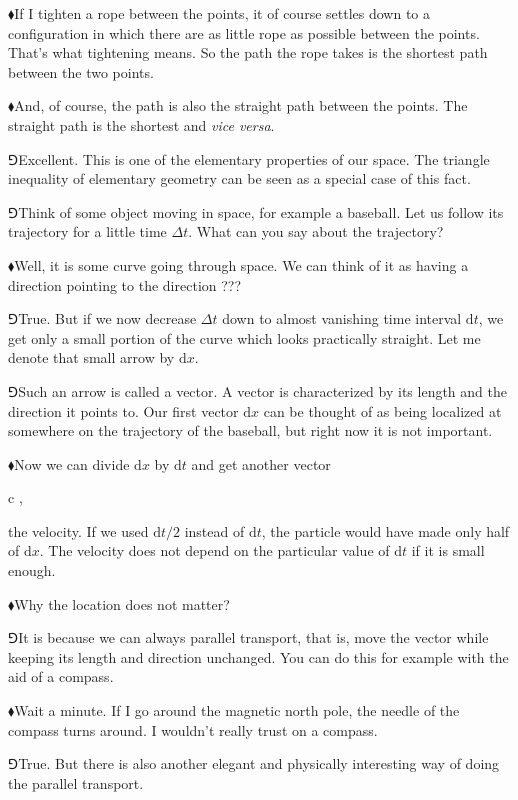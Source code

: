 \documentclass[10pt,oneside%
]{memoir}
\newenvironment{eqna}{\begin{IEEEeqnarray*}{c}}{\end{IEEEeqnarray*}\ignorespacesafterend}
\newcommand{\der}[2]{\frac{\dd#1}{\dd#2}}
\newcommand{\dd}{\mathrm{d}}
\newcommand{\hea}{\(\blacklozenge\)\;}
\newcommand{\heb}{\(\Game\)\;}
\begin{document}
\hea If I tighten a rope between the points, it of course settles down to a configuration in which there are as little rope as possible between the points. That's what tightening means. So the path the rope takes is the shortest path between the two points.

\hea And, of course, the path is also the straight path between the points. The straight path is the shortest and \emph{vice versa}.

\heb Excellent. This is one of the elementary properties of our space. The triangle inequality of elementary geometry can be seen as a special case of this fact.

\heb Think of some object moving in space, for example a baseball. Let us follow its trajectory for a little time \(\Delta t\). What can you say about the trajectory?

\hea Well, it is some curve going through space. We can think of it as having a direction pointing to the direction ???

\heb True. But if we now decrease \(\Delta t\) down to almost vanishing time interval \(\dd t\), we get only a small portion of the curve which looks practically straight. Let me denote that small arrow by \(\dd x\).

\heb Such an arrow is called a vector. A vector is characterized by its length and the direction it points to. Our first vector \(\dd x\) can be thought of as being localized at somewhere on the trajectory of the baseball, but right now it is not important.

\hea Now we can divide \(\dd x\) by \(\dd t\) and get another vector
\begin{eqna}
    \der{x}{t}\doteq{},
\end{eqna}
the velocity. If we used \(\dd t/2\) instead of \(\dd t\), the particle would have made only half of \(\dd x\). The velocity does not depend on the particular value of \(\dd t\) if it is small enough.

\hea Why the location does not matter?

\heb It is because we can always parallel transport, that is, move the vector while keeping its length and direction unchanged. You can do this for example with the aid of a compass.

\hea Wait a minute. If I go around the magnetic north pole, the needle of the compass turns around. I wouldn't really trust on a compass.

\heb True. But there is also another elegant and physically interesting way of doing the parallel transport.
\end{document}
